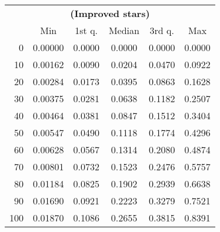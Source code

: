 \begin{tabular}{r|ccccc}
  \multicolumn{6}{c}{{\bf  (Improved stars)}} \\
  & Min & 1st q. & Median & 3rd q. & Max \\ \hline\hline
  0 & 0.00000 & 0.0000 & 0.0000 & 0.0000 & 0.0000
\\ 10 & 0.00162 & 0.0090 & 0.0204 & 0.0470 & 0.0922
\\ 20 & 0.00284 & 0.0173 & 0.0395 & 0.0863 & 0.1628
\\ 30 & 0.00375 & 0.0281 & 0.0638 & 0.1182 & 0.2507
\\ 40 & 0.00464 & 0.0381 & 0.0847 & 0.1512 & 0.3404
\\ 50 & 0.00547 & 0.0490 & 0.1118 & 0.1774 & 0.4296
\\ 60 & 0.00628 & 0.0567 & 0.1314 & 0.2080 & 0.4874
\\ 70 & 0.00801 & 0.0732 & 0.1523 & 0.2476 & 0.5757
\\ 80 & 0.01184 & 0.0825 & 0.1902 & 0.2939 & 0.6638
\\ 90 & 0.01690 & 0.0921 & 0.2223 & 0.3279 & 0.7521
\\ 100 & 0.01870 & 0.1086 & 0.2655 & 0.3815 & 0.8391
\end{tabular}
